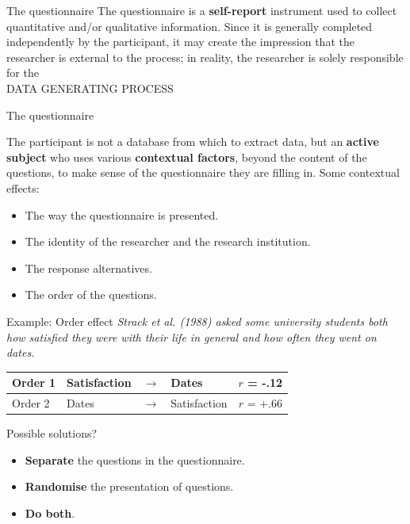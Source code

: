 \documentclass{beamer}
\begin{document}
\begin{frame}{The questionnaire}
    The questionnaire is a \textbf{self-report} instrument used to collect quantitative and/or qualitative information. Since it is generally completed independently by the participant, it may create the impression that the researcher is external to the process; in reality, the researcher is solely responsible for the \\
    \vspace{1em}
    \pause
    \huge\centering
    \alert{DATA GENERATING PROCESS}
\end{frame}

\begin{frame}{The questionnaire}
\begin{block}{The participant}
    is not a database from which to extract data, but an \textbf{active subject} who uses various \textbf{contextual factors}, beyond the content of the questions, to make sense of the questionnaire they are filling in. Some contextual effects: \\
    \begin{itemize}
        \item The way the questionnaire is presented.
        \item The identity of the researcher and the research institution.
        \item The response alternatives.
        \item The order of the questions.
    \end{itemize}
\end{block}
\end{frame}

\begin{frame}{Example: Order effect}
\textit{Strack et al. (1988) asked some university students both how satisfied they were with their life in general and how often they went on dates.} \\
\vspace{1em}
\centering
\begin{tabular}{l|lclc}
    \toprule
   Order 1 & Satisfaction & $\rightarrow$ & Dates & $r$ = -.12 \\
   \midrule
   \pause
   Order 2 & Dates & $\rightarrow$ & Satisfaction & $r$ = +.66 \\
   \bottomrule
\end{tabular}
\vspace{0.3cm}
\begin{block}{Possible solutions?}
\pause
\begin{itemize}
    \item \textbf{Separate} the questions in the questionnaire.
    \pause
    \item \textbf{Randomise} the presentation of questions.
    \pause
    \item \textbf{Do both}.
\end{itemize}
\end{block}
\end{frame}
\end{document}
